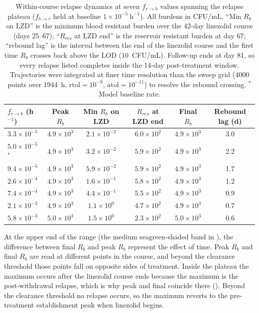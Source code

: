 \documentclass[11pt]{article}
\begin{document}
\begin{table}[H]
    \centering
    \begin{tabular}{lccccc}
        \hline
        $f_{r \to b}$ (h$^{-1}$) & Peak $R_b$ & Min $R_b$ on LZD
            & $R_{res}$ at LZD end & Final $R_b$ & Rebound lag (d) \\
        \hline
        $3.3\times10^{-5}$          & $4.9\times10^{3}$ & $2.1\times10^{-2}$ & $6.0\times10^{2}$ & $4.9\times10^{3}$ & 3.0 \\
        $5.0\times10^{-5}$\,$^{*}$  & $4.9\times10^{3}$ & $3.2\times10^{-2}$ & $5.9\times10^{2}$ & $4.9\times10^{3}$ & 2.2 \\
        $9.4\times10^{-5}$          & $4.9\times10^{3}$ & $5.9\times10^{-2}$ & $5.9\times10^{2}$ & $4.9\times10^{3}$ & 1.7 \\
        $2.6\times10^{-4}$          & $4.9\times10^{3}$ & $1.6\times10^{-1}$ & $5.8\times10^{2}$ & $4.9\times10^{3}$ & 1.2 \\
        $7.4\times10^{-4}$          & $4.9\times10^{3}$ & $4.4\times10^{-1}$ & $5.5\times10^{2}$ & $4.9\times10^{3}$ & 0.9 \\
        $2.1\times10^{-3}$          & $4.9\times10^{3}$ & $1.1\times10^{0}$  & $4.7\times10^{2}$ & $4.9\times10^{3}$ & 0.7 \\
        $5.8\times10^{-3}$          & $5.0\times10^{3}$ & $1.5\times10^{0}$  & $2.3\times10^{2}$ & $5.0\times10^{3}$ & 0.6 \\
        \hline
    \end{tabular}
    \caption{Within-course relapse dynamics at seven $f_{r \to b}$ values
    spanning the relapse plateau ($f_{b \to r}$ held at baseline
    $1\times10^{-5}~\mathrm{h}^{-1}$). All burdens in CFU/mL. ``Min $R_b$ on
    LZD'' is the minimum blood resistant burden over the 42-day linezolid
    course (days 25--67); ``$R_{res}$ at LZD end'' is the reservoir resistant
    burden at day 67; ``rebound lag'' is the interval between the end of the
    linezolid course and the first time $R_b$ crosses back above the LOD
    (10~CFU/mL). Follow-up ends at day 81, so every relapse listed completes
    inside the 14-day post-treatment window. Trajectories were integrated at
    finer time resolution than the sweep grid (4000 points over 1944~h,
    $\mathrm{rtol}=10^{-9}$, $\mathrm{atol}=10^{-11}$) to resolve the rebound
    crossing. $^{*}$Model baseline rate.}
    \label{tab:frb_plateau_relapse}
\end{table}

At the upper end of the range (the medium seagreen-shaded band in
), the difference between final $R_b$ and peak $R_b$ represent the effect of time.
Peak $R_b$ and final $R_b$ are read at
different points in the course, and beyond the clearance threshold those
points fall on opposite sides of treatment. Inside the plateau the maximum
occurs after the linezolid course ends because the maximum
is the post-withdrawal relapse, which is why peak and final coincide
there (). Beyond the clearance threshold no
relapse occurs, so the maximum reverts to the pre-treatment establishment
peak when linezolid begins. 
\end{document}
